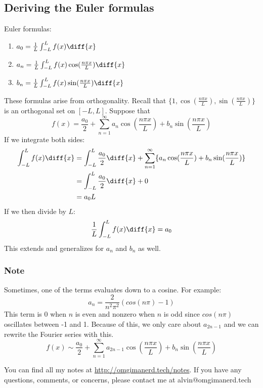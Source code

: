 \documentclass{math}
\begin{document}
\subsection*{Deriving the Euler formulas}
Euler formulas:
\begin{enumerate}
  \item \( a_0 = \frac{1}{L}\int_{-L}^{L}f(x)\diff{x} \)
  \item \( a_n = \frac{1}{L}\int_{-L}^{L}f(x)\cos(\frac{n\pi x}{L})\diff{x} \)
  \item \( b_n = \frac{1}{L}\int_{-L}^{L}f(x)\sin(\frac{n\pi x}{L})\diff{x} \)
\end{enumerate}
These formulas arise from orthogonality. Recall that \( \{1,
\cos(\frac{n\pi x}{L}),\sin(\frac{n\pi x}{L}) \} \) is an orthogonal set on
\( [-L,L] \). Suppose that
\[ f(x) = \frac{a_0}{2}+\sum_{n=1}^{\infty}a_n\cos(\frac{n\pi x}{L})+
  b_n\sin(\frac{n\pi x}{L}) \]
If we integrate both sides:
\begin{align*}
  \int_{-L}^{L}f(x)\diff{x} &= \int_{-L}^{L}\frac{a_0}{2}\diff{x}+
    \sum_{n=1}^{\infty}\{a_n\cos(\frac{n\pi x}{L})+
    b_n\sin(\frac{n\pi x}{L})\} \\
  &= \int_{-L}^{L}\frac{a_0}{2}\diff{x}+0 \\
  &= a_0L
\end{align*}
If we then divide by \( L \):
\[ \frac{1}{L}\int_{-L}^{L}f(x)\diff{x} = a_0 \]
This extends and generalizes for \( a_n \) and \( b_n \) as well.

\subsubsection*{Note}
Sometimes, one of the terms evaluates down to a cosine. For example:
\[ a_n = \frac{2}{n^2\pi^2}(cos(n\pi)-1) \]
This term is 0 when \( n \) is even and nonzero when \( n \) is odd since
\( cos(n\pi) \) oscillates between -1 and 1. Because of this, we only care about
\( a_{2n-1} \) and we can rewrite the Fourier series with this.
\[ f(x) \sim \frac{a_0}{2}+\sum_{n=1}^{\infty}a_{2n-1}\cos(\frac{n\pi x}{L})+
  b_n\sin(\frac{n\pi x}{L}) \]

\begin{center}
  You can find all my notes at \url{http://omgimanerd.tech/notes}. If you have
  any questions, comments, or concerns, please contact me at
  alvin@omgimanerd.tech
\end{center}
\end{document}
